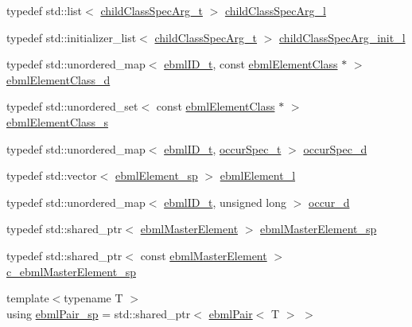 \begin{DoxyCompactItemize}
\item 
typedef std\+::list$<$ \mbox{\hyperlink{structebml_1_1childClassSpecArg__t}{child\+Class\+Spec\+Arg\+\_\+t}} $>$ \mbox{\hyperlink{namespaceebml_abf07998998c284c9be3f76b5d9e192e1}{child\+Class\+Spec\+Arg\+\_\+l}}
\item 
typedef std\+::initializer\+\_\+list$<$ \mbox{\hyperlink{structebml_1_1childClassSpecArg__t}{child\+Class\+Spec\+Arg\+\_\+t}} $>$ \mbox{\hyperlink{namespaceebml_a40cf7ad4b58caaa8c07da3ed83f7a431}{child\+Class\+Spec\+Arg\+\_\+init\+\_\+l}}
\item 
typedef std\+::unordered\+\_\+map$<$ \mbox{\hyperlink{namespaceebml_a86c5f604ddf12a74aa9812e997a58691}{ebml\+I\+D\+\_\+t}}, const \mbox{\hyperlink{classebml_1_1ebmlElementClass}{ebml\+Element\+Class}} $\ast$ $>$ \mbox{\hyperlink{namespaceebml_a103756ab7f2c1c3c2bbc34334bd9b416}{ebml\+Element\+Class\+\_\+d}}
\item 
typedef std\+::unordered\+\_\+set$<$ const \mbox{\hyperlink{classebml_1_1ebmlElementClass}{ebml\+Element\+Class}} $\ast$ $>$ \mbox{\hyperlink{namespaceebml_a014ea85f559c01fc8f53b63240eecc8a}{ebml\+Element\+Class\+\_\+s}}
\item 
typedef std\+::unordered\+\_\+map$<$ \mbox{\hyperlink{namespaceebml_a86c5f604ddf12a74aa9812e997a58691}{ebml\+I\+D\+\_\+t}}, \mbox{\hyperlink{structebml_1_1occurSpec__t}{occur\+Spec\+\_\+t}} $>$ \mbox{\hyperlink{namespaceebml_a1cd7dafb7e8e8975fecc4a11ef03c5be}{occur\+Spec\+\_\+d}}
\item 
typedef std\+::vector$<$ \mbox{\hyperlink{namespaceebml_adad533b7705a16bb360fe56380c5e7be}{ebml\+Element\+\_\+sp}} $>$ \mbox{\hyperlink{namespaceebml_a1ddadd26791f273d851882653b9caf70}{ebml\+Element\+\_\+l}}
\item 
typedef std\+::unordered\+\_\+map$<$ \mbox{\hyperlink{namespaceebml_a86c5f604ddf12a74aa9812e997a58691}{ebml\+I\+D\+\_\+t}}, unsigned long $>$ \mbox{\hyperlink{namespaceebml_a4ecb956f78f49ef5e24e0d0db9b646f4}{occur\+\_\+d}}
\item 
typedef std\+::shared\+\_\+ptr$<$ \mbox{\hyperlink{classebml_1_1ebmlMasterElement}{ebml\+Master\+Element}} $>$ \mbox{\hyperlink{namespaceebml_af0dd39c01f0391f27971528001c1dc0e}{ebml\+Master\+Element\+\_\+sp}}
\item 
typedef std\+::shared\+\_\+ptr$<$ const \mbox{\hyperlink{classebml_1_1ebmlMasterElement}{ebml\+Master\+Element}} $>$ \mbox{\hyperlink{namespaceebml_a7a62721c59c06de6cadf348c51eabe1c}{c\+\_\+ebml\+Master\+Element\+\_\+sp}}
\item 
{\footnotesize template$<$typename T $>$ }\\using \mbox{\hyperlink{namespaceebml_a15439f6031c0f4ced33b9ab5e28af120}{ebml\+Pair\+\_\+sp}} = std\+::shared\+\_\+ptr$<$ \mbox{\hyperlink{classebml_1_1ebmlPair}{ebml\+Pair}}$<$ T $>$ $>$

\end{DoxyCompactItemize}
